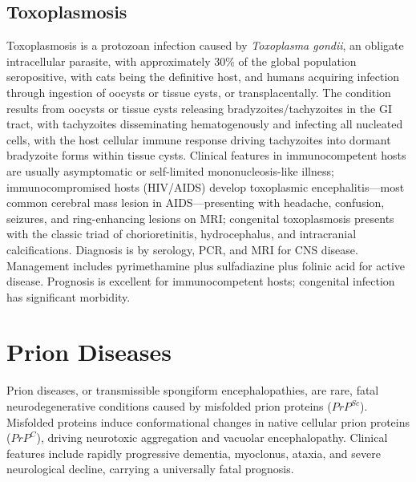 \subsection{Toxoplasmosis}
\label{sec:Toxoplasmosis}
Toxoplasmosis is a protozoan infection caused by \textit{Toxoplasma gondii}, an obligate intracellular parasite, with approximately 30\% of the global population seropositive, with cats being the definitive host, and humans acquiring infection through ingestion of oocysts or tissue cysts, or transplacentally. The condition results from oocysts or tissue cysts releasing bradyzoites/tachyzoites in the GI tract, with tachyzoites disseminating hematogenously and infecting all nucleated cells, with the host cellular immune response driving tachyzoites into dormant bradyzoite forms within tissue cysts. Clinical features in immunocompetent hosts are usually asymptomatic or self-limited mononucleosis-like illness; immunocompromised hosts (HIV/AIDS) develop toxoplasmic encephalitis---most common cerebral mass lesion in AIDS---presenting with headache, confusion, seizures, and ring-enhancing lesions on MRI; congenital toxoplasmosis presents with the classic triad of chorioretinitis, hydrocephalus, and intracranial calcifications. Diagnosis is by serology, PCR, and MRI for CNS disease. Management includes pyrimethamine plus sulfadiazine plus folinic acid for active disease. Prognosis is excellent for immunocompetent hosts; congenital infection has significant morbidity.

\section{Prion Diseases}




Prion diseases, or transmissible spongiform encephalopathies, are rare, fatal neurodegenerative conditions caused by misfolded prion proteins ($PrP^{Sc}$). Misfolded proteins induce conformational changes in native cellular prion proteins ($PrP^C$), driving neurotoxic aggregation and vacuolar encephalopathy. Clinical features include rapidly progressive dementia, myoclonus, ataxia, and severe neurological decline, carrying a universally fatal prognosis.


